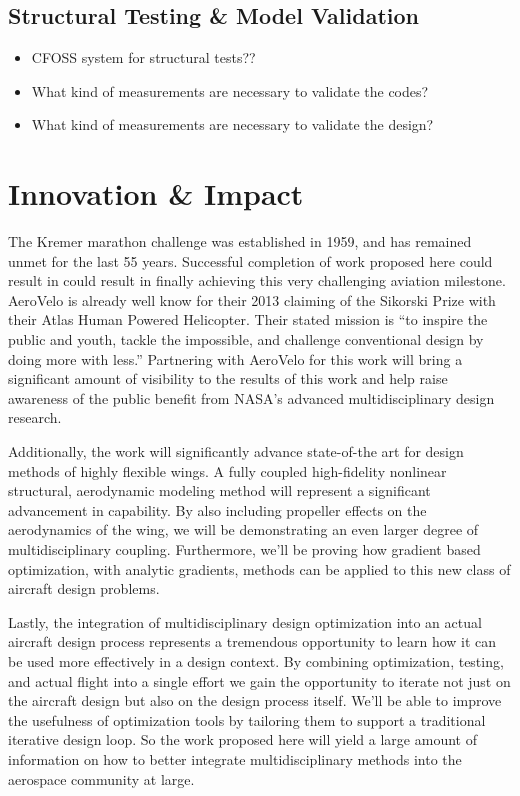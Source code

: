 \documentclass[]{aiaa-tc}
\begin{document}
    \subsection{Structural Testing \& Model Validation}
        \begin{itemize}
            \item CFOSS system for structural tests?? 
            \item What kind of measurements are necessary to validate the codes? 
            \item What kind of measurements are necessary to validate the design? 
        \end{itemize}



  \section{Innovation \& Impact}

    The Kremer marathon challenge was established in 1959, and has remained unmet for the last 55 years. 
    Successful completion of work proposed here could result in could result in finally achieving this very challenging
    aviation milestone. AeroVelo is already well know for their 2013 claiming of the Sikorski Prize with their Atlas 
    Human Powered Helicopter. Their stated mission is ``to inspire the public and youth, tackle the impossible, and 
    challenge conventional design by doing more with less.'' Partnering with AeroVelo for this work will bring a significant
    amount of visibility to the results of this work and help raise awareness of the public benefit from NASA's advanced 
    multidisciplinary design research. 

    Additionally, the work will significantly advance state-of-the art for design methods of highly flexible wings. 
    A fully coupled high-fidelity nonlinear structural, aerodynamic modeling method will represent a significant advancement 
    in capability. By also including propeller effects on the aerodynamics of the wing, we will be demonstrating an even larger 
    degree of multidisciplinary coupling. Furthermore, we'll be proving how gradient based optimization, with analytic gradients, 
    methods can be applied to this new class of aircraft design problems. 

    Lastly, the integration of multidisciplinary design optimization into an actual aircraft design process represents
    a tremendous opportunity to learn how it can be used more effectively in a design context. By combining optimization, 
    testing, and actual flight into a single effort we gain the opportunity to iterate not just on the aircraft 
    design but also on the design process itself. We'll be able to improve the usefulness of optimization tools by 
    tailoring them to support a traditional iterative design loop. So the work proposed here will yield a large amount 
    of information on how to better integrate multidisciplinary methods into the aerospace community at large. 
\end{document}
